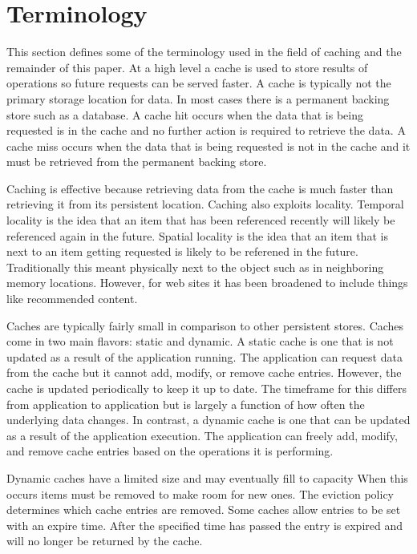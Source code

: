\documentclass[12pt]{article}
\begin{document}
\section{Terminology}
This section defines some of the terminology used in the field of caching and the remainder of this paper.
At a high level a cache is used to store results of operations so future requests can be served faster.
A cache is typically not the primary storage location for data.
In most cases there is a permanent backing store such as a database.
A cache hit occurs when the data that is being requested is in the cache and no further action is required to retrieve the data.
A cache miss occurs when the data that is being requested is not in the cache and it must be retrieved from the permanent backing store.

Caching is effective because retrieving data from the cache is much faster than retrieving it from its persistent location.
Caching also exploits locality.
Temporal locality is the idea that an item that has been referenced recently will likely be referenced again in the future.
Spatial locality is the idea that an item that is next to an item getting requested is likely to be referened in the future.
Traditionally this meant physically next to the object such as in neighboring memory locations.
However, for web sites it has been broadened to include things like recommended content.

Caches are typically fairly small in comparison to other persistent stores.
Caches come in two main flavors: static and dynamic. %
A static cache is one that is not updated as a result of the application running.
The application can request data from the cache but it cannot add, modify, or remove cache entries.
However, the cache is updated periodically to keep it up to date.
The timeframe for this differs from application to application but is largely a function of how often the underlying data changes.
In contrast, a dynamic cache is one that can be updated as a result of the application execution.
The application can freely add, modify, and remove cache entries based on the operations it is performing.

Dynamic caches have a limited size and may eventually fill to capacity
When this occurs items must be removed to make room for new ones.
The eviction policy determines which cache entries are removed.
Some caches allow entries to be set with an expire time.
After the specified time has passed the entry is expired and will no longer be returned by the cache.
\end{document}
